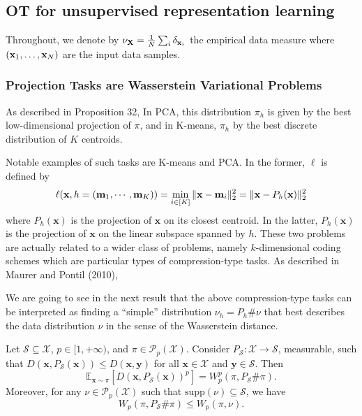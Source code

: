 \subsection{OT for unsupervised representation learning}

Throughout, we denote by $\nu_{{\mathbf{X}}} = \frac{1}{N} \sum_i \delta_{{\mathbf{x}}_i}$ the empirical data measure where $({\mathbf{x}}_1, \ldots, {\mathbf{x}}_N)$ are the input data samples.


\subsubsection{Projection Tasks are Wasserstein Variational Problems}


As described in Proposition 32,  In PCA, this distribution \(\pi_h\) is given by the best low-dimensional projection of
\(\pi\), and in K-means, \(\pi_h\) by the best discrete distribution of \(K\) centroids.

Notable examples of such tasks are K-means and PCA. In the former, \(\ell\) is defined by
\[
\ell(\mathbf{x}, h = ({\mathbf{m}}_1, \cdots, {\mathbf{m}}_K)) = \min_{i \in [K]} \|\mathbf{x} - {\mathbf{m}}_i\|_2^2 = \|\mathbf{x} - P_h(\mathbf{x})\|_2^2
\]
where \(P_h(\mathbf{x})\) is the projection of \(\mathbf{x}\) on its closest centroid. In the latter, \(P_h(\mathbf{x})\) is the projection of \(\mathbf{x}\) on the linear subspace spanned by \(h\). These two problems are actually related to a wider class of problems, namely \(k\)-dimensional coding schemes which are particular types of compression-type tasks. As described in Maurer and Pontil (2010),


We are going to see in the next result that the above compression-type tasks can be interpreted as finding a “simple” distribution $\nu_h = P_h \# \nu$ that best describes the data distribution $\nu$ in the sense of the Wasserstein distance.

\begin{lemma}
    Let $\mathcal{S} \subseteq \mathcal{X}$, $p \in [1, +\infty)$, and $\pi \in \mathcal{P}_p(\mathcal{X})$. Consider $P_{\mathcal{S}} : \mathcal{X} \to \mathcal{S}$, measurable, such that $D(\mathbf{x}, P_{\mathcal{S}}(\mathbf{x})) \leq D(\mathbf{x}, \mathbf{y})$ for all $\mathbf{x} \in \mathcal{X}$ and $\mathbf{y} \in \mathcal{S}$. Then 
    \[
    \mathbb{E}_{\mathbf{x} \sim \pi} \left[ D(\mathbf{x}, P_{\mathcal{S}}(\mathbf{x}))^p \right] = W_p^p(\pi, P_{\mathcal{S}} \# \pi).
    \]
    Moreover, for any $\nu \in \mathcal{P}_p(\mathcal{X})$ such that $\mathrm{supp}(\nu) \subseteq \mathcal{S}$, we have
    \[
    W_p(\pi, P_{\mathcal{S}} \# \pi) \leq W_p(\pi, \nu).
    \]
\end{lemma}

